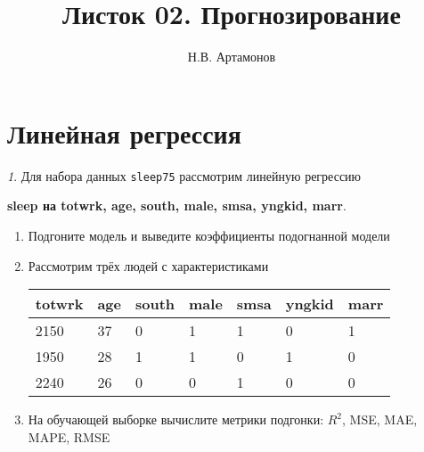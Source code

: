 \documentclass[12pt]{article}
\title{Листок 02. Прогнозирование}
\author{Н.В. Артамонов}
\theoremstyle{remark}
\newtheorem{exercise}{}[section]
\begin{document}
\maketitle

\tableofcontents

\section{Линейная регрессия}

\begin{exercise}
Для набора данных \texttt{sleep75} рассмотрим линейную регрессию 
\begin{center}
	\textbf{sleep на totwrk, age, south, male, smsa, yngkid, marr}.
\end{center}
\begin{enumerate}
	\item Подгоните модель и выведите коэффициенты подогнанной модели
	\item Рассмотрим трёх людей с характеристиками
	\begin{center}
		\begin{tabular}{|l|l|l|l|l|l|l|}\hline
			totwrk & age & south & male & smsa & yngkid & marr \\ \hline\hline
			2150 & 37 & 0 & 1 & 1 & 0 & 1  \\
			1950 & 28 & 1 & 1 & 0 & 1 & 0 \\  
			2240 & 26 & 0 & 0 & 1 & 0 & 0 \\ \hline
		\end{tabular}
	\end{center}
	\item На обучающей выборке вычислите метрики подгонки: \(R^2\), 
	MSE, MAE, MAPE, RMSE
\end{enumerate}
\end{exercise}
\end{document}
